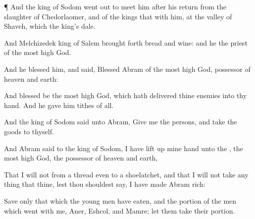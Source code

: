 {\par }{\PP {}¶ And the
king of
Sodom went
out to
meet him
after his
return from the
slaughter of
Chedorlaomer, and of the
kings that
{} with him, at the
valley of
Shaveh,
which
{} the
king’s
dale.

And
Melchizedek
king of
Salem brought
forth
bread and
wine: and he
{} the
priest of the most
high
God.

And he
blessed him, and
said,
Blessed
{}
Abram of the most
high
God,
possessor of
heaven and
earth:

And
blessed be the most
high
God, which hath
delivered thine
enemies into thy
hand. And he
gave him
tithes of all.


\par }{\PP {}And the
king of
Sodom
said unto
Abram,
Give me the
persons, and
take the
goods to thyself.

And
Abram
said to the
king of
Sodom, I have lift
up mine
hand unto the
{}, the most
high
God, the
possessor of
heaven and
earth,

That I will
not
{} from a
thread even to a
shoelatchet, and that I will
not
take any thing that
{} thine, lest thou shouldest
say, I have
made
Abram
rich:

Save only that
which the young
men have
eaten, and the
portion of the
men which
went
with me,
Aner,
Eshcol, and
Mamre; let
them
take their
portion.




\par }
